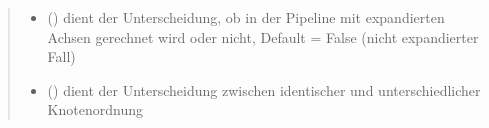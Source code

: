 \documentclass[a4paper,10pt,ngerman]{sphinxmanual}
\begin{document}
\begin{fulllineitems}
\begin{quote}
\begin{description}
\begin{itemize}
\item {} 
\sphinxAtStartPar
{} () \textendash{} dient der Unterscheidung, ob in der Pipeline mit expandierten Achsen gerechnet wird oder nicht, Default = False (nicht expandierter Fall)

\item {} 
\sphinxAtStartPar
{} () \textendash{} dient der Unterscheidung zwischen identischer und unterschiedlicher Knotenordnung

\end{itemize}

\sphinxAtStartPar
{}

\end{description}\end{quote}

\end{fulllineitems}

\end{document}
